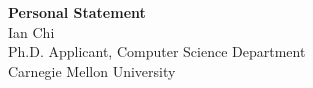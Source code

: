 \documentclass[11pt]{article}
\begin{document}
\begin{center}
    {\Large \textbf{Personal Statement}}\\[4pt]
    {\large Ian Chi}\\[2pt]
    Ph.D. Applicant, Computer Science Department\\
    Carnegie Mellon University
\end{center}

\vspace{1em}

\end{document}
